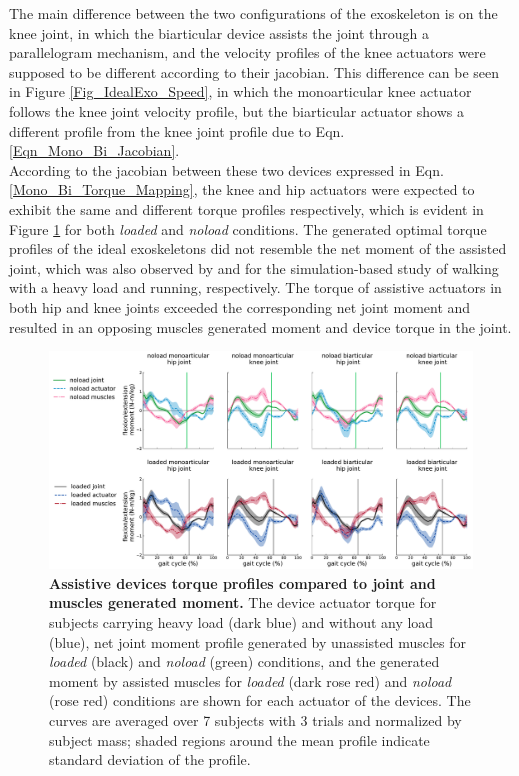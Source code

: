 \documentclass[10pt,letterpaper]{article}
\begin{document}
The main difference between the two configurations of the exoskeleton is on the knee joint, in which the biarticular device assists the joint through a parallelogram mechanism, and the velocity profiles of the knee actuators were supposed to be different according to their jacobian. This difference can be seen in Figure \ref{Fig_IdealExo_Speed}, in which the monoarticular knee actuator follows the knee joint velocity profile, but the biarticular actuator shows a different profile from the knee joint profile due to Eqn. \eqref{Eqn_Mono_Bi_Jacobian}.\\
According to the jacobian between these two devices expressed in Eqn. \ref{Mono_Bi_Torque_Mapping}, the knee and hip actuators were expected to exhibit the same and different torque profiles respectively, which is evident in Figure \ref{Fig_IdealExo_Torque} for both \textit{loaded} and \textit{noload} conditions. The generated optimal torque profiles of the ideal exoskeletons did not resemble the net moment of the assisted joint, which was also observed by \cite{93} and \cite{2} for the simulation-based study of walking with a heavy load and running, respectively. The torque of assistive actuators in both hip and knee joints exceeded the corresponding net joint moment and resulted in an opposing muscles generated moment and device torque in the joint.\\
\begin{figure}[ht]   
	\centering
	\includegraphics[width=\linewidth]{Ideal_Exo_MonovsBi_Figures/PaperFigure_Exoskeletons_Torque.pdf}
	\vspace{1mm}
	\caption{{\small\textbf{Assistive devices torque profiles compared to joint and muscles generated moment.} The device actuator torque for subjects carrying heavy load (dark blue) and without any load (blue), net joint moment profile generated by unassisted muscles for \textit{loaded} (black) and \textit{noload} (green) conditions, and the generated moment by assisted muscles for \textit{loaded} (dark rose red) and \textit{noload} (rose red) conditions are shown for each actuator of the devices. The curves are averaged over 7 subjects with 3 trials and normalized by subject mass; shaded regions around the mean profile indicate standard deviation of the profile.}}
	\label{Fig_IdealExo_Torque}
\end{figure}
\end{document}
